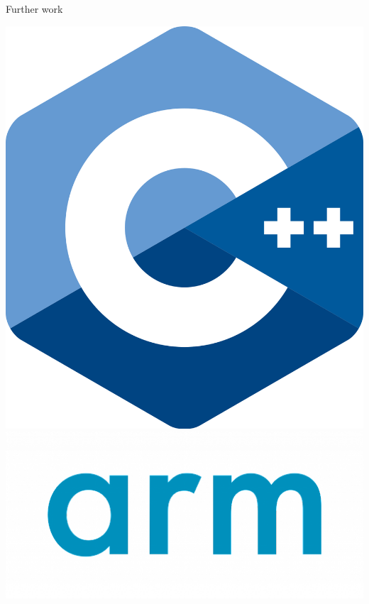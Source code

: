 \begin{frame}{Further work}


      
            
    

  \begin{center}
    \hfill
    \includegraphics[width=0.15\linewidth]{cpp.png} \hfill
    \includegraphics[width=0.3\linewidth]{arm.png} \hfill
     \hfill
  \end{center}


\end{frame}
